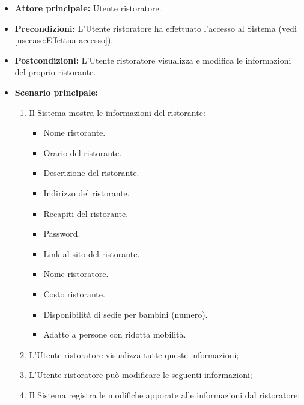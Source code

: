 \label{usecase:Gestione informazioni ristorante}
\begin{itemize}
	\item \textbf{Attore principale:} Utente ristoratore.

	\item \textbf{Precondizioni:} L'Utente ristoratore ha effettuato l'accesso al Sistema (vedi \autoref{usecase:Effettua accesso}).

	\item \textbf{Postcondizioni:} L'Utente ristoratore visualizza e modifica le informazioni del proprio ristorante.


	\item \textbf{Scenario principale:}
	      \begin{enumerate}

		      \item Il Sistema mostra le informazioni del ristorante:
		      \begin{itemize}
                \item Nome ristorante.
                \item Orario del ristorante.
                \item Descrizione del ristorante.
                \item Indirizzo del ristorante.
                \item Recapiti del ristorante.
                \item Password. 
                \item Link al sito del ristorante.
                \item Nome ristoratore.
                \item Costo ristorante.
                \item Disponibilità di sedie per bambini (numero).
                \item Adatto a persone con ridotta mobilità.
              \end{itemize}

		      \item L'Utente ristoratore visualizza tutte queste informazioni;
		      \item L'Utente ristoratore può modificare le seguenti informazioni;
		      \item Il Sistema registra le modifiche apporate alle informazioni dal ristoratore;

	      \end{enumerate}
\end{itemize}
